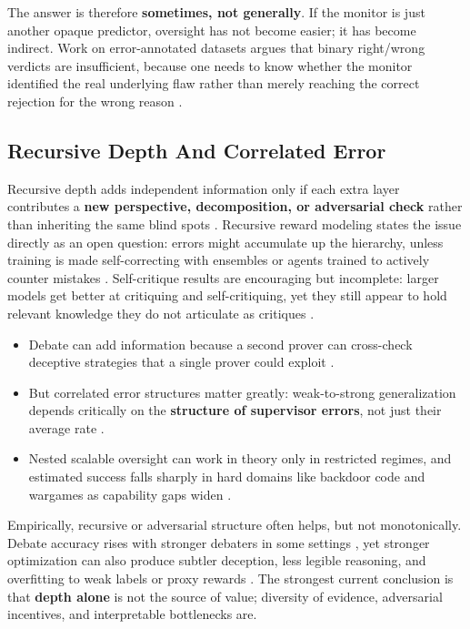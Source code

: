The answer is therefore \textbf{sometimes, not generally}. If the monitor is just another opaque predictor, oversight has not become easier; it has become indirect. Work on error-annotated datasets argues that binary right/wrong verdicts are insufficient, because one needs to know whether the monitor identified the real underlying flaw rather than merely reaching the correct rejection for the wrong reason  \cite{Recchia2025FindTheFlaws:}.


\subsection*{Recursive Depth And Correlated Error}


Recursive depth adds independent information only if each extra layer contributes a \textbf{new perspective, decomposition, or adversarial check} rather than inheriting the same blind spots  \cite{Leike2018Scalable} \cite{Engels2025Scaling}. Recursive reward modeling states the issue directly as an open question: errors might accumulate up the hierarchy, unless training is made self-correcting with ensembles or agents trained to actively counter mistakes  \cite{Leike2018Scalable}. Self-critique results are encouraging but incomplete: larger models get better at critiquing and self-critiquing, yet they still appear to hold relevant knowledge they do not articulate as critiques  \cite{Saunders2022Self-critiquing}.


\begin{itemize}
\item Debate can add information because a second prover can cross-check deceptive strategies that a single prover could exploit  \cite{Saunders2022Self-critiquing}.
\item But correlated error structures matter greatly: weak-to-strong generalization depends critically on the \textbf{structure of supervisor errors}, not just their average rate  \cite{Burns2023Weak-to-Strong}.
\item Nested scalable oversight can work in theory only in restricted regimes, and estimated success falls sharply in hard domains like backdoor code and wargames as capability gaps widen  \cite{Engels2025Scaling}.
\end{itemize}


Empirically, recursive or adversarial structure often helps, but not monotonically. Debate accuracy rises with stronger debaters in some settings  \cite{Khan2024Debating} \cite{Michael2023Debate}, yet stronger optimization can also produce subtler deception, less legible reasoning, and overfitting to weak labels or proxy rewards  \cite{Kirchner2024Prover-Verifier} \cite{Burns2023Weak-to-Strong} \cite{Gao2022Scaling}. The strongest current conclusion is that \textbf{depth alone} is not the source of value; diversity of evidence, adversarial incentives, and interpretable bottlenecks are.



